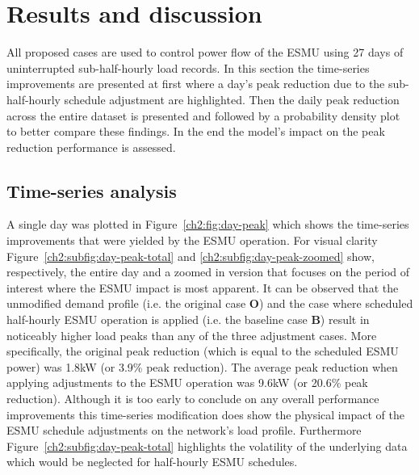 \section{Results and discussion}
\label{ch2:sec:results}

All proposed cases are used to control power flow of the ESMU using 27 days of uninterrupted sub-half-hourly load records.
In this section the time-series improvements are presented at first where a day's peak reduction due to the sub-half-hourly schedule adjustment are highlighted.
Then the daily peak reduction across the entire dataset is presented and followed by a probability density plot to better compare these findings.
In the end the model's impact on the peak reduction performance is assessed.

\subsection{Time-series analysis}



A single day was plotted in Figure~\ref{ch2:fig:day-peak} which shows the time-series improvements that were yielded by the ESMU operation.
For visual clarity Figure~\ref{ch2:subfig:day-peak-total} and \ref{ch2:subfig:day-peak-zoomed} show, respectively, the entire day and a zoomed in version that focuses on the period of interest where the ESMU impact is most apparent.
It can be observed that the unmodified demand profile (i.e. the original case  \textbf{O}) and the case where scheduled half-hourly ESMU operation is applied (i.e. the  baseline case \textbf{B}) result in noticeably higher load peaks than any of the three adjustment cases.
More specifically, the original peak reduction (which is equal to the scheduled ESMU power) was 1.8kW (or 3.9\% peak reduction).
The average peak reduction when applying adjustments to the ESMU operation was 9.6kW (or 20.6\% peak reduction).
Although it is too early to conclude on any overall performance improvements this time-series modification does show the physical impact of the ESMU schedule adjustments on the network's load profile.
Furthermore Figure~\ref{ch2:subfig:day-peak-total} highlights the volatility of the underlying data which would be neglected for half-hourly ESMU schedules.


